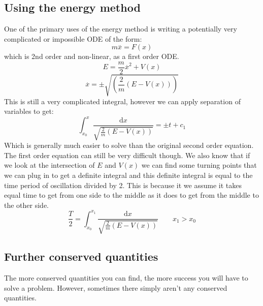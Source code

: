 \documentclass[12pt]{article}
\begin{document}
\subsection*{Using the energy method}
One of the primary uses of the energy method is writing a potentially very complicated or impossible ODE of the form:
\[m\overset{..}{x}=F(x)\]
which is 2nd order and non-linear, as a first order ODE.
\[E=\frac{m}{2}\overset{.}{x}^2+V(x)\]
\[\overset{.}{x}=\pm\sqrt{\left(\frac{2}{m}(E-V(x))\right)}\]
This is still a very complicated integral, however we can apply separation of variables to get:
\[\int_{x_0}^x\frac{\text{d}x}{\sqrt{\frac{2}{m}(E-V(x))}}=\pm t+c_1\]
Which is generally much easier to solve than the original second order equation. The first order equation can still be very difficult though. We also know that if we look at the intersection of \(E\) and \(V(x)\) we can find some turning points that we can plug in to get a definite integral and this definite integral is equal to the time period of oscillation divided by 2. This is because it we assume it takes equal time to get from one side to the middle as it does to get from the middle to the other side.
\[\frac{T}{2}=\int_{x_0}^{x_1}\frac{\text{d}x}{\sqrt{\frac{2}{m}\left(E-V(x)\right)}}\qquad x_1>x_0\]
\subsection*{Further conserved quantities}
The more conserved quantities you can find, the more success you will have to solve a problem. However, sometimes there simply aren’t any conserved quantities.
\end{document}
